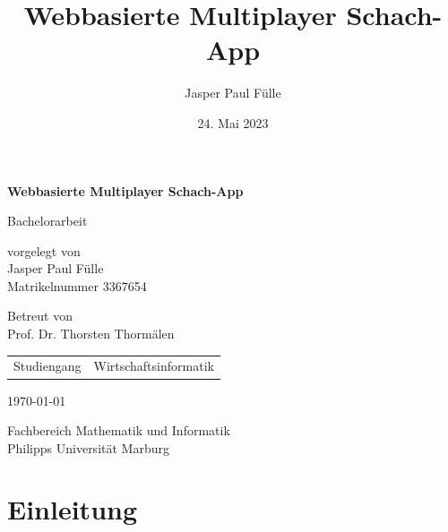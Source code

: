 \documentclass[a4paper,12pt]{report}
\title{Webbasierte Multiplayer Schach-App}
\author{Jasper Paul Fülle}
\date{24. Mai 2023}
\begin{document}
\begin{titlepage}
    \begin{center}
        \vspace*{1cm}
        
        \Large
        \textbf{Webbasierte Multiplayer Schach-App}
        
        \vspace{0.5cm}
        
        Bachelorarbeit
        
        \vspace{1.5cm}
        
        \normalsize
        vorgelegt von\\
        Jasper Paul Fülle\\
        Matrikelnummer 3367654
        
        \vspace{1cm}
        
        Betreut von\\
        Prof. Dr. Thorsten Thormälen
        
        \vspace{1cm}
        
        \begin{tabular}{>{\raggedright}p{4cm}>{\raggedleft}p{4cm}}
        Studiengang & Wirtschaftsinformatik \\
        \end{tabular}
        
        \vspace{1cm}
        
        \today
        
        \vfill
        
        
        \vspace{0.5cm}
        
        Fachbereich Mathematik und Informatik\\
        Philipps Universität Marburg
    \end{center}
\end{titlepage}

\tableofcontents

\chapter{Einleitung}
\end{document}
